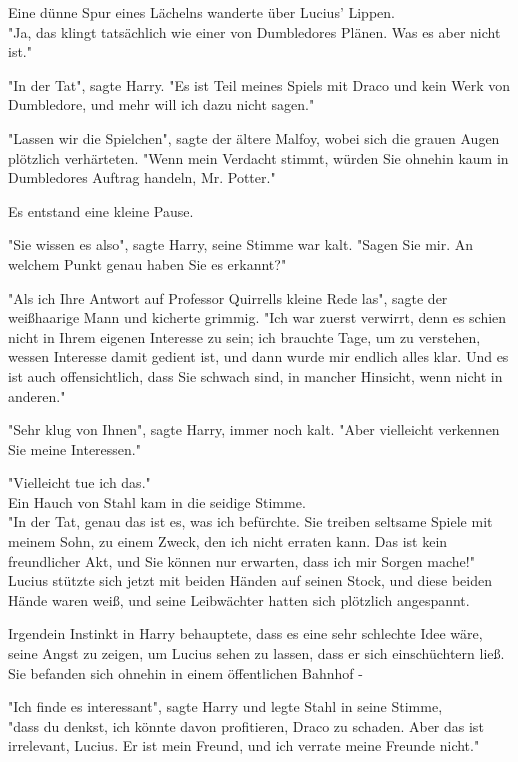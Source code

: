 {Eine dünne Spur eines Lächelns wanderte über Lucius' Lippen.\\ "Ja, das klingt tatsächlich wie einer von Dumbledores Plänen. Was es aber nicht ist."

"In der Tat", sagte Harry. "Es ist Teil meines Spiels mit Draco und kein Werk von Dumbledore, und mehr will ich dazu nicht sagen."

"Lassen wir die Spielchen", sagte der ältere Malfoy, wobei sich die grauen Augen plötzlich verhärteten. "Wenn mein Verdacht stimmt, würden Sie ohnehin kaum in Dumbledores Auftrag handeln, Mr. Potter."

Es entstand eine kleine Pause.

"Sie wissen es also", sagte Harry, seine Stimme war kalt. "Sagen Sie mir. An welchem Punkt genau haben Sie es erkannt?"

"Als ich Ihre Antwort auf Professor Quirrells kleine Rede las", sagte der weißhaarige Mann und kicherte grimmig. "Ich war zuerst verwirrt, denn es schien nicht in Ihrem eigenen Interesse zu sein; ich brauchte Tage, um zu verstehen, wessen Interesse damit gedient ist, und dann wurde mir endlich alles klar. Und es ist auch offensichtlich, dass Sie schwach sind, in mancher Hinsicht, wenn nicht in anderen."

"Sehr klug von Ihnen", sagte Harry, immer noch kalt. "Aber vielleicht verkennen Sie meine Interessen."

"Vielleicht tue ich das."\\ Ein Hauch von Stahl kam in die seidige Stimme.\\ "In der Tat, genau das ist es, was ich befürchte. Sie treiben seltsame Spiele mit meinem Sohn, zu einem Zweck, den ich nicht erraten kann. Das ist kein freundlicher Akt, und Sie können nur erwarten, dass ich mir Sorgen mache!"\\ Lucius stützte sich jetzt mit beiden Händen auf seinen Stock, und diese beiden Hände waren weiß, und seine Leibwächter hatten sich plötzlich angespannt.

Irgendein Instinkt in Harry behauptete, dass es eine sehr schlechte Idee wäre, seine Angst zu zeigen, um Lucius sehen zu lassen, dass er sich einschüchtern ließ. Sie befanden sich ohnehin in einem öffentlichen Bahnhof -

"Ich finde es interessant", sagte Harry und legte Stahl in seine Stimme,\\ "dass du denkst, ich könnte davon profitieren, Draco zu schaden. Aber das ist irrelevant, Lucius. Er ist mein Freund, und ich verrate meine Freunde nicht."

}
